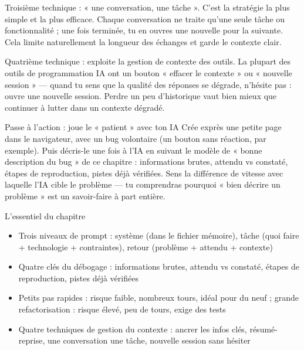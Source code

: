 Troisième technique : « une conversation, une tâche ». C'est la stratégie la plus simple et la plus efficace. Chaque conversation ne traite qu'une seule tâche ou fonctionnalité ; une fois terminée, tu en ouvres une nouvelle pour la suivante. Cela limite naturellement la longueur des échanges et garde le contexte clair.

Quatrième technique : exploite la gestion de contexte des outils. La plupart des outils de programmation IA ont un bouton « effacer le contexte » ou « nouvelle session » — quand tu sens que la qualité des réponses se dégrade, n'hésite pas : ouvre une nouvelle session. Perdre un peu d'historique vaut bien mieux que continuer à lutter dans un contexte dégradé.

\begin{tcbpractice}{Passe à l'action : joue le « patient » avec ton IA}
Crée exprès une petite page dans le navigateur, avec un bug volontaire (un bouton sans réaction, par exemple). Puis décris-le une fois à l'IA en suivant le modèle de « bonne description du bug » de ce chapitre : informations brutes, attendu vs constaté, étapes de reproduction, pistes déjà vérifiées. Sens la différence de vitesse avec laquelle l'IA cible le problème — tu comprendras pourquoi « bien décrire un problème » est un savoir-faire à part entière.

\end{tcbpractice}

\begin{tcbsummary}{L'essentiel du chapitre}
\begin{itemize}
  \item Trois niveaux de prompt : système (dans le fichier mémoire), tâche (quoi faire + technologie + contraintes), retour (problème + attendu + contexte)
  \item Quatre clés du débogage : informations brutes, attendu vs constaté, étapes de reproduction, pistes déjà vérifiées
  \item Petits pas rapides : risque faible, nombreux tours, idéal pour du neuf ; grande refactorisation : risque élevé, peu de tours, exige des tests
  \item Quatre techniques de gestion du contexte : ancrer les infos clés, résumé-reprise, une conversation une tâche, nouvelle session sans hésiter
\end{itemize}

\end{tcbsummary}

